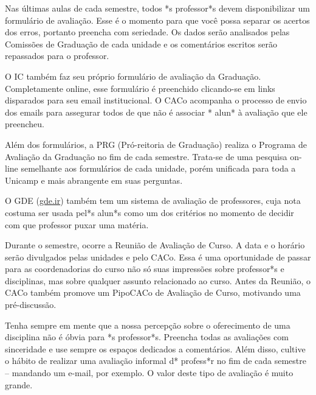 Nas últimas aulas de cada semestre, todos *s professor*s devem disponibilizar um
formulário de avaliação. Esse é o momento para que você possa separar os acertos
dos erros, portanto preencha com seriedade. Os dados serão analisados pelas
Comissões de Graduação de cada unidade e os comentários escritos serão
repassados para o professor.

O IC também faz seu próprio formulário de avaliação da Graduação. Completamente
online, esse formulário é preenchido clicando-se em links disparados para seu
email institucional. O CACo acompanha o processo de envio dos emails para
assegurar todos de que não é associar * alun* à avaliação que ele preencheu.

Além dos formulários, a PRG (Pró-reitoria de Graduação) realiza o Programa de
Avaliação da Graduação no fim de cada semestre. Trata-se de uma pesquisa on-line
semelhante aos formulários de cada unidade, porém unificada para toda a Unicamp
e mais abrangente em suas perguntas.

O GDE (\url{gde.ir}) também tem um sistema de avaliação de professores, cuja
nota costuma ser usada pel*s alun*s como um dos critérios no momento de decidir
com que professor puxar uma matéria.

Durante o semestre, ocorre a Reunião de Avaliação de Curso. A data e o horário
serão divulgados pelas unidades e pelo CACo. Essa é uma oportunidade de passar
para as coordenadorias do curso não só suas impressões sobre professor*s e
disciplinas, mas sobre qualquer assunto relacionado ao curso. Antes da Reunião,
o CACo também promove um PipoCACo de Avaliação de Curso, motivando uma
pré-discussão.

Tenha sempre em mente que a nossa percepção sobre o oferecimento de uma
disciplina não é óbvia para *s professor*s. Preencha todas as avaliações com
sinceridade e use sempre os espaços dedicados a comentários. Além disso, cultive
o hábito de realizar uma avaliação informal d* profess*r no fim de cada semestre
-- mandando um e-mail, por exemplo. O valor deste tipo de avaliação é muito
grande.

